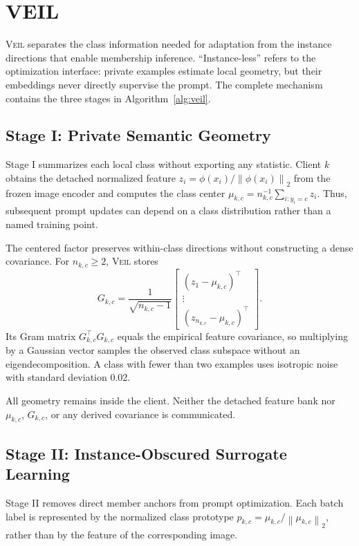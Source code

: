 \documentclass[letterpaper]{article}
\newcommand{\method}{\textsc{Veil}}
\newcommand{\norm}[1]{\left\lVert #1 \right\rVert_2}
\begin{document}
\section{VEIL}

\method{} separates the class information needed for adaptation from the
instance directions that enable membership inference.  ``Instance-less'' refers
to the optimization interface: private examples estimate local geometry, but
their embeddings never directly supervise the prompt.  The complete mechanism
contains the three stages in Algorithm~\ref{alg:veil}.

\subsection{Stage I: Private Semantic Geometry}

Stage I summarizes each local class without exporting any statistic.  Client
$k$ obtains the detached normalized feature
$z_i=\phi(x_i)/\norm{\phi(x_i)}$ from the frozen image encoder and computes the
class center $\mu_{k,c}=n_{k,c}^{-1}\sum_{i:y_i=c}z_i$.  Thus, subsequent prompt
updates can depend on a class distribution rather than a named training point.

The centered factor preserves within-class directions without constructing a
dense covariance.  For $n_{k,c}\geq2$, \method{} stores
\begin{equation}
G_{k,c}=\frac{1}{\sqrt{n_{k,c}-1}}
\begin{bmatrix}
(z_1-\mu_{k,c})^\top\\
\vdots\\
(z_{n_{k,c}}-\mu_{k,c})^\top
\end{bmatrix}.
\label{eq:geometry-factor}
\end{equation}
Its Gram matrix $G_{k,c}^{\top}G_{k,c}$ equals the empirical feature covariance,
so multiplying by a Gaussian vector samples the observed class subspace without
an eigendecomposition.  A class with fewer than two examples uses isotropic
noise with standard deviation 0.02.

All geometry remains inside the client.  Neither the detached feature bank nor
$\mu_{k,c}$, $G_{k,c}$, or any derived covariance is communicated.

\subsection{Stage II: Instance-Obscured Surrogate Learning}

Stage II removes direct member anchors from prompt optimization.  Each batch
label is represented by the normalized class prototype
$p_{k,c}=\mu_{k,c}/\norm{\mu_{k,c}}$, rather than by the feature of the
corresponding image.
\end{document}
